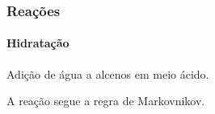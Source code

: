 
\begin{frame}
\frametitle{Reações}
\framesubtitle{Hidratação}

Adição de água a alcenos em meio ácido.

\begin{figure}
\centering
{}
\end{figure}

A reação segue a regra de Markovnikov.

\end{frame}
